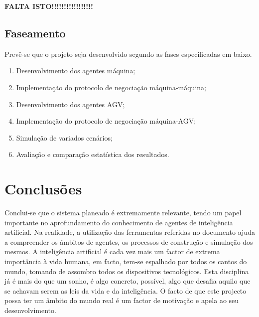 \begin{titlepage}
\textbf{FALTA ISTO!!!!!!!!!!!!!!!!!}

\subsection{Faseamento}
Prevê-se que o projeto seja desenvolvido segundo as fases especificadas em baixo.

\begin{enumerate}
\item Desenvolvimento dos agentes máquina;
\item Implementação do protocolo de negociação máquina-máquina;
\item Desenvolvimento dos agentes AGV;
\item Implementação do protocolo de negociação máquina-AGV;
\item Simulação de variados cenários;
\item Avaliação e comparação estatística dos resultados.
\end{enumerate}

\section{Conclusões}
\justify\normalsize
Conclui-se que o sistema planeado é extremamente relevante, tendo um papel importante no aprofundamento do conhecimento de agentes de inteligência artificial. Na realidade, a utilização das ferramentas referidas no documento ajuda a compreender os âmbitos de agentes, os processos de construção e simulação dos mesmos. A inteligência artificial é cada vez mais um factor de extrema importância à vida humana, em facto, tem-se espalhado por todos os cantos do mundo, tomando de assombro todos os dispositivos tecnológicos. Esta disciplina já é mais do que um sonho, é algo concreto, possível, algo que desafia aquilo que se achavam serem as leis da vida e da inteligência. O facto de que este projecto possa ter um âmbito do mundo real é um factor de motivação e apela ao seu desenvolvimento.




\end{titlepage}
